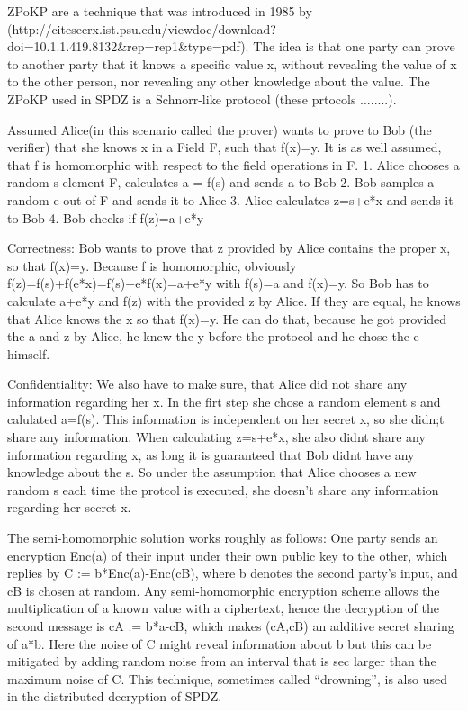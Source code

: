 \documentclass[english,runningheads,a4paper]{llncs}[2018/03/10]
\begin{document}
ZPoKP are a technique that was introduced  in 1985 by (http://citeseerx.ist.psu.edu/viewdoc/download?doi=10.1.1.419.8132\&rep=rep1\&type=pdf). The idea is that one party can prove to another party that it knows a specific value x, without revealing the value of x to the other person, nor revealing any other knowledge about the value. 
The ZPoKP used in SPDZ is a Schnorr-like protocol (these prtocols ........).

Assumed Alice(in this scenario called the prover) wants to prove to Bob (the verifier) that she knows x in a Field F, such that f(x)=y. It is as well assumed, that f is homomorphic with respect to the field operations in F.
1. Alice chooses a random s element F, calculates a = f(s) and sends a to Bob
2. Bob samples a random e out of F and sends it to Alice
3. Alice calculates z=s+e*x and sends it to Bob
4. Bob checks if f(z)=a+e*y

Correctness:
Bob wants to prove that z provided by Alice contains the proper x, so that f(x)=y. 
Because f is homomorphic, obviously f(z)=f(s)+f(e*x)=f(s)+e*f(x)=a+e*y with f(s)=a and f(x)=y.
So Bob has to calculate a+e*y and f(z) with the provided z by Alice. If they are equal, he knows that Alice knows the x so that f(x)=y.
He can do that, because he got provided the a and z by Alice, he knew the y before the protocol and he chose the e himself.

Confidentiality:
We also have to make sure, that Alice did not share any information regarding her x.
In the firt step she chose a random element s and calulated a=f(s). This information is independent on her secret x, so she didn;t share any information.
When calculating z=s+e*x, she also didnt share any information regarding x, as long it is guaranteed that Bob didnt have any knowledge about the s.
So under the assumption that Alice chooses a new random s each time the protcol is executed, she doesn't share any information regarding her secret x.



The semi-homomorphic solution works roughly as follows: One party sends an encryption Enc(a) of their input under their own public key to the other, which replies by C := b*Enc(a)-Enc(cB), where b denotes the second party’s input, and cB is chosen at random. Any semi-homomorphic encryption scheme allows the multiplication of a known value with a ciphertext, hence the decryption of the second message is cA := b*a-cB, which makes (cA,cB) an additive secret sharing of a*b. Here the noise of C might reveal information about b but this can be mitigated by adding random noise from an interval that is sec larger than the maximum noise of C. This technique, sometimes called “drowning”, is also used in the distributed decryption of SPDZ. 
\end{document}
